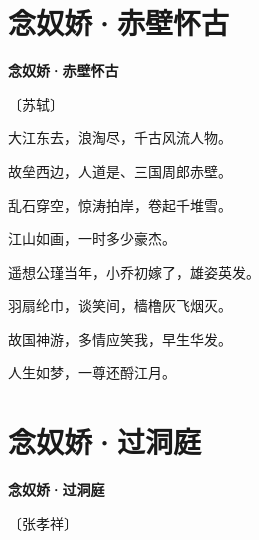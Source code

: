 \documentclass[12pt,UTF-8,openany,fontset=none]{ctexbook}
\begin{document}
\vspace{8pt}
\clearpage

\section{念奴娇·赤壁怀古}


\begin{center}
    {\bfseries 念奴娇·赤壁怀古}

    \vspace{18pt}

    \begin{large}\xuwen
        〔苏轼〕
    \end{large}

\end{center}

    \vspace{18pt}  %

\begin{center}
    \begin{Large}

        大江东去，浪淘尽，千古风流人物。

        故垒西边，人道是、三国周郎赤壁。

        乱石穿空，惊涛拍岸，卷起千堆雪。

        江山如画，一时多少豪杰。

        \vspace{18pt}  %

        遥想公瑾当年，小乔初嫁了，雄姿英发。

        羽扇纶巾，谈笑间，樯橹灰飞烟灭。

        故国神游，多情应笑我，早生华发。

        人生如梦，一尊还酹江月。

    \end{Large}

\end{center}

\vspace{8pt}
\clearpage

\section{念奴娇·过洞庭}


\begin{center}
    {\bfseries 念奴娇·过洞庭}

    \vspace{18pt}

    \begin{large}\xuwen
        〔张孝祥〕
    \end{large}

\end{center}
\end{document}
